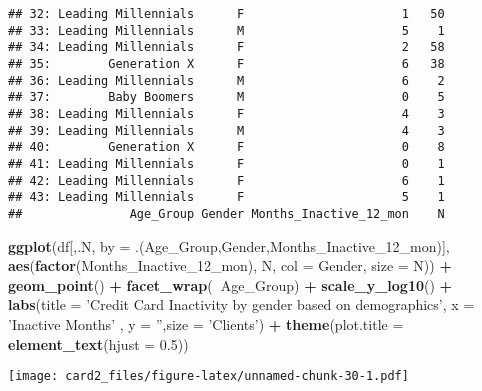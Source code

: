 \documentclass[]{article}
\newenvironment{Shaded}{\begin{snugshade}}{\end{snugshade}}
\newcommand{\DataTypeTok}[1]{\textcolor[rgb]{0.13,0.29,0.53}{#1}}
\newcommand{\DecValTok}[1]{\textcolor[rgb]{0.00,0.00,0.81}{#1}}
\newcommand{\FloatTok}[1]{\textcolor[rgb]{0.00,0.00,0.81}{#1}}
\newcommand{\KeywordTok}[1]{\textcolor[rgb]{0.13,0.29,0.53}{\textbf{#1}}}
\newcommand{\NormalTok}[1]{#1}
\newcommand{\OperatorTok}[1]{\textcolor[rgb]{0.81,0.36,0.00}{\textbf{#1}}}
\newcommand{\StringTok}[1]{\textcolor[rgb]{0.31,0.60,0.02}{#1}}
\begin{document}
\begin{verbatim}
## 32: Leading Millennials      F                      1   50
## 33: Leading Millennials      M                      5    1
## 34: Leading Millennials      F                      2   58
## 35:        Generation X      F                      6   38
## 36: Leading Millennials      M                      6    2
## 37:        Baby Boomers      M                      0    5
## 38: Leading Millennials      F                      4    3
## 39: Leading Millennials      M                      4    3
## 40:        Generation X      F                      0    8
## 41: Leading Millennials      F                      0    1
## 42: Leading Millennials      F                      6    1
## 43: Leading Millennials      F                      5    1
##               Age_Group Gender Months_Inactive_12_mon    N
\end{verbatim}

\begin{Shaded}
\begin{Highlighting}[]
\KeywordTok{ggplot}\NormalTok{(df[,.N, }\DataTypeTok{by =}\NormalTok{ .(Age_Group,Gender,Months_Inactive_}\DecValTok{12}\NormalTok{_mon)], }\KeywordTok{aes}\NormalTok{(}\KeywordTok{factor}\NormalTok{(Months_Inactive_}\DecValTok{12}\NormalTok{_mon), N, }\DataTypeTok{col =}\NormalTok{ Gender, }\DataTypeTok{size =}\NormalTok{ N)) }\OperatorTok{+}\StringTok{ }\KeywordTok{geom_point}\NormalTok{() }\OperatorTok{+}\StringTok{ }\KeywordTok{facet_wrap}\NormalTok{(}\OperatorTok{~}\NormalTok{Age_Group) }\OperatorTok{+}\StringTok{ }\KeywordTok{scale_y_log10}\NormalTok{() }\OperatorTok{+}\StringTok{ }\KeywordTok{labs}\NormalTok{(}\DataTypeTok{title =} \StringTok{'Credit Card Inactivity by gender based on demographics'}\NormalTok{, }\DataTypeTok{x =} \StringTok{'Inactive Months'}\NormalTok{ , }\DataTypeTok{y =} \StringTok{''}\NormalTok{,}\DataTypeTok{size =} \StringTok{'Clients'}\NormalTok{) }\OperatorTok{+}\StringTok{ }\KeywordTok{theme}\NormalTok{(}\DataTypeTok{plot.title =} \KeywordTok{element_text}\NormalTok{(}\DataTypeTok{hjust =} \FloatTok{0.5}\NormalTok{))}
\end{Highlighting}
\end{Shaded}

\texttt{[image: card2\_files/figure-latex/unnamed-chunk-30-1.pdf]}
\end{document}
